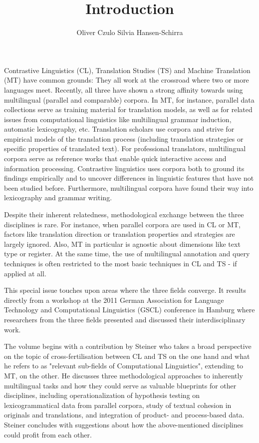 \documentclass[output=paper]{LSP/langsci}
\author{Oliver Czulo \lastand Silvia Hansen-Schirra \affiliation{University of Mainz, Germersheim}}
\title{Introduction}
\begin{document}
Contrastive Linguistics (CL), Translation Studies (TS) and Machine
Translation (MT) have common grounds: They all work at the crossroad where two or more languages meet. Recently, all three have shown a strong affinity towards using multilingual (parallel and comparable) corpora. In MT, for instance, parallel data collections serve as training material for translation models, as well as for related issues from computational linguistics like multilingual grammar induction, automatic lexicography, etc. Translation scholars use corpora and strive for empirical models of the translation process (including translation strategies or specific properties of translated text). For professional translators, multilingual corpora serve as reference works that enable quick interactive access and information processing. Contrastive linguistics uses corpora both to ground its findings empirically and to uncover differences in linguistic features that have not been studied before. Furthermore, multilingual corpora have found their way into lexicography and grammar writing. 

Despite their inherent relatedness, methodological exchange between the three disciplines is rare. For instance, when parallel corpora are used in CL or MT, factors like translation direction or translation properties and strategies are largely ignored. Also, MT in particular is agnostic about dimensions like text type or register. At the same time, the use of multilingual annotation and query techniques is often restricted to the most basic techniques in CL and TS - if applied at all.

This special issue touches upon areas where the three fields converge. It results directly from a workshop at the 2011 German Association for Language Technology and Computational Linguistics (GSCL) conference in Hamburg where researchers from the three fields presented and discussed their interdisciplinary work.

\largerpage
The volume begins with a contribution by Steiner who takes a broad perspective on the topic of cross-fertilisation between CL and TS on the one hand and what he refers to as "relevant sub-fields of Computational Linguistics", extending to MT, on the other. He discusses three methodological approaches to inherently multilingual tasks and how they could serve as valuable blueprints for other disciplines, including operationalization of hypothesis testing on lexicogrammatical data from parallel corpora, study of textual cohesion in originals and translations, and integration of product- and process-based data. Steiner concludes with suggestions about how the above-mentioned disciplines could profit from each other.
\end{document}
